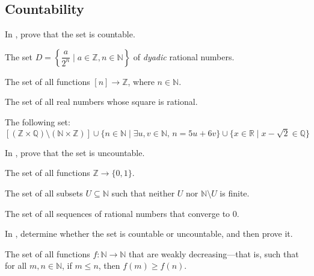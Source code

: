 \subsection*{Countability}

In , prove that the set is countable.

\begin{chapex}
\label{cqProveCountableBegin}
The set $D = \left\{ \dfrac{a}{2^n} \mid a \in \mathbb{Z}, n \in \mathbb{N} \right\}$ of \textit{dyadic} rational numbers.
\end{chapex}

\begin{chapex}
The set of all functions $[n] \to \mathbb{Z}$, where $n \in \mathbb{N}$.
\end{chapex}

\begin{chapex}
The set of all real numbers whose square is rational.
\end{chapex}

\begin{chapex}
\label{cqProveCountableEnd}
The following set:
\[
[(\mathbb{Z} \times \mathbb{Q}) \setminus (\mathbb{N} \times \mathbb{Z})] \cup \{ n \in \mathbb{N} \mid \exists u,v \in \mathbb{N},\, n=5u+6v \} \cup \{ x \in \mathbb{R} \mid x-\sqrt{2} \in \mathbb{Q} \}
\]
\end{chapex}

In , prove that the set is uncountable.

\begin{chapex}
\label{cqProveUncountableBegin}
The set of all functions $\mathbb{Z} \to \{ 0,1 \}$.
\end{chapex}

\begin{chapex}
The set of all subsets $U \subseteq \mathbb{N}$ such that neither $U$ nor $\mathbb{N} \setminus U$ is finite.
\end{chapex}

\begin{chapex}
\label{cqProveUncountableEnd}
The set of all sequences of rational numbers that converge to $0$.
\end{chapex}

In , determine whether the set is countable or uncountable, and then prove it.

\begin{chapex}
\label{cqDetermineIfCountableBegin}
The set of all functions $f : \mathbb{N} \to \mathbb{N}$ that are weakly decreasing---that is, such that for all $m,n \in \mathbb{N}$, if $m \le n$, then $f(m) \ge f(n)$.
\end{chapex}

